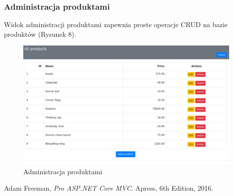 \documentclass[a4paper,10pt]{article}
\begin{document}
\subsubsection{Administracja produktami}
Widok administracji produktami zapewnia proste operacje CRUD na bazie produktów (Rysunek 8).
\begin{figure}
 \centering
 \includegraphics[width=\linewidth]{Images/products_crud.png}
 \caption{Administracja produktami}
 \label{rys:}
\end{figure}
\begin{thebibliography}{1}
  Adam Freeman,
  \emph{Pro ASP.NET Core MVC}.
  Apress,
  6th Edition,
  2016.
\end{thebibliography}
\end{document}
